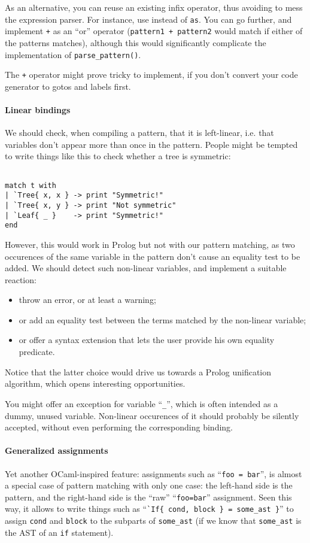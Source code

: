 As an alternative, you can reuse an existing infix operator, thus
avoiding to mess the expression parser. For instance, use {\tt *}
instead of {\tt as}. You can go further, and implement {\tt +} as an
``or'' operator ({\tt pattern1 + pattern2} would match if either
of the patterns matches), although this would significantly complicate
the implementation of {\tt parse\_pattern()}. 

The {\tt+} operator might prove tricky to implement, if you don't
convert your code generator to gotos and labels first.

\paragraph{Linear bindings}
We should check, when compiling a pattern, that it is left-linear,
i.e. that variables don't appear more than once in the pattern. People
might be tempted to write things like this to check whether a tree is
symmetric:
\begin{Verbatim}[fontsize=\scriptsize]

match t with
| `Tree{ x, x } -> print "Symmetric!"
| `Tree{ x, y } -> print "Not symmetric"
| `Leaf{ _ }    -> print "Symmetric!"
end
\end{Verbatim}
However, this would work in Prolog but not with our pattern matching,
as two occurences of the same variable in the pattern don't cause an
equality test to be added. We should detect such non-linear variables,
and implement a suitable reaction:
\begin{itemize}
\item throw an error, or at least a warning;
\item or add an equality test between the terms matched by the
  non-linear variable;
\item or offer a syntax extension that lets the user provide his own
  equality predicate.
\end{itemize}

Notice that the latter choice would drive us towards a Prolog
unification algorithm, which opens interesting opportunities.

You might offer an exception for variable ``{\tt\_}'', which is often
intended as a dummy, unused variable. Non-linear occurences of it
should probably be silently accepted, without even performing the
corresponding binding. 

\paragraph{Generalized assignments}
Yet another OCaml-inspired feature: assignments such as
``\verb|foo = bar|'', is almost a special
case of pattern matching with only one case: the left-hand side is
the pattern, and the right-hand side is the ``raw'' ``\verb|foo=bar|''
assignment. Seen this way, it allows to write things such as
``\verb|`If{ cond, block } = some_ast }|'' to assign \verb|cond| and
\verb|block| to the subparts of \verb|some_ast| (if we know that
\verb|some_ast| is the AST of an \verb|if| statement). 

